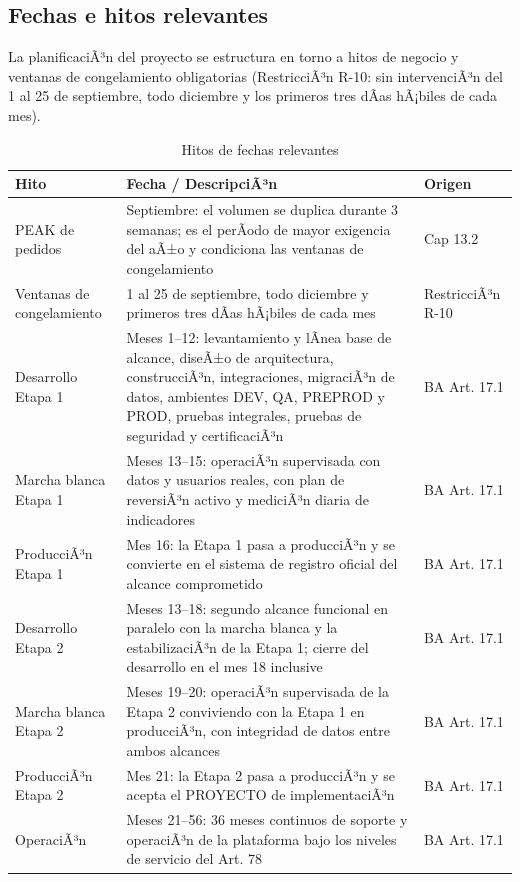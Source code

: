 \subsection{Fechas e hitos relevantes}

La planificaciÃ³n del proyecto se estructura en torno a hitos de negocio y ventanas de
congelamiento obligatorias (RestricciÃ³n R-10: sin intervenciÃ³n del 1 al 25 de
septiembre, todo diciembre y los primeros tres dÃ­as hÃ¡biles de cada mes).

\begin{table}[htbp]
\centering
\small
\caption{Hitos de fechas relevantes}
\label{tab:hitos}
\begin{tabularx}{\textwidth}{@{}L{4.2cm}L{8.5cm}L{3cm}@{}}
\toprule
\textbf{Hito} & \textbf{Fecha / DescripciÃ³n} & \textbf{Origen} \\
\midrule
PEAK de pedidos &
Septiembre: el volumen se duplica durante 3 semanas; es el perÃ­odo de mayor
exigencia del aÃ±o y condiciona las ventanas de congelamiento &
Cap 13.2 \\
\addlinespace
Ventanas de congelamiento &
1 al 25 de septiembre, todo diciembre y primeros tres dÃ­as hÃ¡biles de cada mes &
RestricciÃ³n R-10 \\
\addlinespace
Desarrollo Etapa 1 &
Meses 1--12: levantamiento y lÃ­nea base de alcance, diseÃ±o de arquitectura, construcciÃ³n, integraciones, migraciÃ³n de datos, ambientes DEV, QA, PREPROD y PROD, pruebas integrales, pruebas de seguridad y certificaciÃ³n &
BA Art. 17.1 \\
\addlinespace
Marcha blanca Etapa 1 &
Meses 13--15: operaciÃ³n supervisada con datos y usuarios reales, con plan de reversiÃ³n activo y mediciÃ³n diaria de indicadores &
BA Art. 17.1 \\
\addlinespace
ProducciÃ³n Etapa 1 &
Mes 16: la Etapa 1 pasa a producciÃ³n y se convierte en el sistema de registro oficial del alcance comprometido &
BA Art. 17.1 \\
\addlinespace
Desarrollo Etapa 2 &
Meses 13--18: segundo alcance funcional en paralelo con la marcha blanca y la estabilizaciÃ³n de la Etapa 1; cierre del desarrollo en el mes 18 inclusive &
BA Art. 17.1 \\
\addlinespace
Marcha blanca Etapa 2 &
Meses 19--20: operaciÃ³n supervisada de la Etapa 2 conviviendo con la Etapa 1 en producciÃ³n, con integridad de datos entre ambos alcances &
BA Art. 17.1 \\
\addlinespace
ProducciÃ³n Etapa 2 &
Mes 21: la Etapa 2 pasa a producciÃ³n y se acepta el PROYECTO de implementaciÃ³n &
BA Art. 17.1 \\
\addlinespace
OperaciÃ³n &
Meses 21--56: 36 meses continuos de soporte y operaciÃ³n de la plataforma bajo los niveles de servicio del Art. 78 &
BA Art. 17.1 \\
\bottomrule
\end{tabularx}
\end{table}

